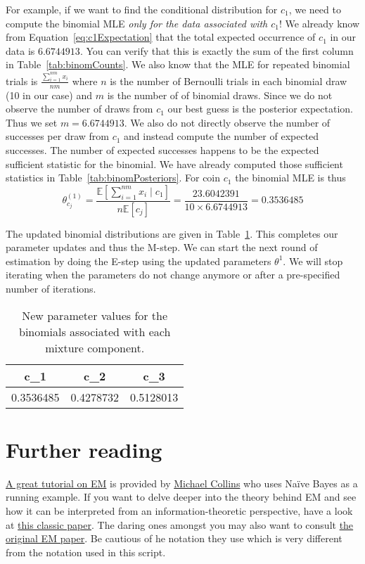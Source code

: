 \documentclass[a4paper,11pt,leqno]{report}\usepackage[]{graphicx}\usepackage[]{color}
\newcommand{\E}{\mathbb{E}}
\begin{document}
For example, if we want to find the conditional distribution for $ c_{1} $, we need to compute the binomial MLE \textit{only
for the data associated with $ c_{1} $}! We already know from Equation~\eqref{eq:c1Expectation} that the total expected 
occurrence of $ c_{1} $ in our data is $ 6.6744913 $. You can verify that this is exactly the sum of the first column in
Table~\ref{tab:binomCounts}. We also know that the MLE for repeated binomial trials is $ \frac{\sum^{nm}_{i=1}x_{i}}{nm} $ where
$ n $ is the number of Bernoulli trials in each binomial draw (10 in our case) and $ m $ is the number of of binomial draws. Since we do
not observe the number of draws from $ c_{1} $ our best guess is the posterior expectation. Thus we set $ m = 6.6744913 $. We also do not
directly observe the number of successes per draw from $ c_{1} $ and instead compute the number of expected successes. The number of 
expected successes happens to be the expected sufficient statistic for the binomial. We have already computed those sufficient statistics
in Table~\ref{tab:binomPosteriors}. For coin $ c_{1} $ the binomial MLE is thus
\begin{equation}
\theta_{c_{j}}^{(1)} =  \frac{\E\left[\sum_{i=1}^{nm} x_{i}\mid c_{1}\right]}{n\E\left[c_{j}\right]} 
= \frac{23.6042391}{10 \times 6.6744913}
= 0.3536485
\end{equation}

The updated binomial distributions are given in Table~\ref{tab:newBinoms}. This completes our parameter
updates and thus the M-step. We can start the next round of estimation by doing the E-step using the
updated parameters $ \theta^{1} $. We will stop iterating when the parameters do not change anymore or
after a pre-specified number of iterations.

\begin{table}
\center

\begin{tabular}{c|c|c}
\hline
c\_1 & c\_2 & c\_3\\
\hline
0.3536485 & 0.4278732 & 0.5128013\\
\hline
\end{tabular}


\caption{New parameter values for the binomials associated with each mixture component.}
\label{tab:newBinoms}
\end{table}

\section*{Further reading}
\href{http://www.cs.columbia.edu/~mcollins/em.pdf}{A great tutorial on EM} is provided by \href{http://www.cs.columbia.edu/~mcollins/}{Michael Collins} who
uses Na\"ive Bayes as a running example. If you want to delve deeper into the theory behind EM and see how it can be interpreted from an information-theoretic
perspective, have a look at \href{http://www.cs.toronto.edu/~fritz/absps/emk.pdf}{this classic paper}. The daring ones amongst you may also want to consult
\href{http://web.mit.edu/6.435/www/Dempster77.pdf}{the original EM paper}. Be cautious of he notation they use which is very different from the notation
used in this script.
\end{document}
